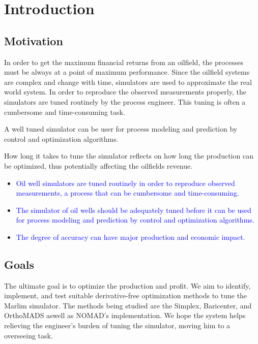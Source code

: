 

\chapter{Introduction} \label{chap:1}



\section{Motivation}

In order to get the maximum financial returns from an oilfield, the processes must be always at a point of maximum performance. Since the oilfield systems are complex and change with time, simulators are used to approximate the real world system. In order to reproduce the observed measurements properly, 
the simulators are tuned routinely by the process engineer. This tuning is often a cumbersome and time-consuming task.

A well tuned simulator can be user for process modeling and prediction by control and optimization algorithms.

How long it takes to tune the simulator reflects on how long the production can be optimized, thus potentially affecting the oilfields revenue.


\begin{itemize}

 \item \textcolor{blue}{Oil well simulators are tuned routinely in order to reproduce observed measurements, a process that can be cumbersome and time-consuming}.
 
 \item \textcolor{blue}{The simulator of oil wells should be adequately tuned before it can be used for process modeling and prediction by control and optimization algorithms.}
 
 \item \textcolor{blue}{The degree of accuracy can have major production and economic impact.}
\end{itemize}


\section{Goals}

The ultimate goal is to optimize the production and profit. We aim to identify, implement, and test suitable derivative-free optimization methods to tune the Marlim simulator. The methods being studied are the Simplex, Baricenter, and OrthoMADS aswell as NOMAD's implementation.
We hope the system helps relieving the engineer's burden of tuning the simulator, moving him to a overseeing task. 

